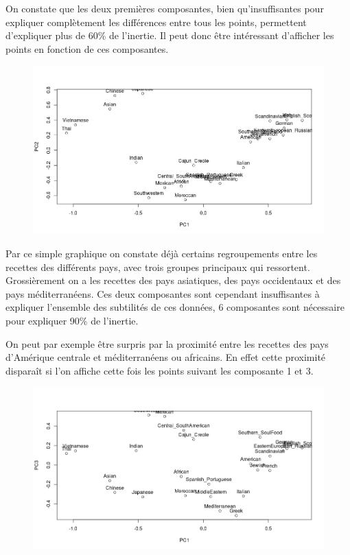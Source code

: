 \documentclass[a4paper, titlepage]{report}
\begin{document}
On constate que les deux premières composantes, bien qu'insuffisantes pour expliquer complètement les différences entre tous les points, permettent d'expliquer plus de 60\% de l'inertie. Il peut donc être intéressant d'afficher les points en fonction de ces composantes.
\begin{figure}[h]
	\begin{center}
		\includegraphics[scale = 0.32]{./doc/plot-recettes-composantes-1-2.png}
	\end{center}
\end{figure}

Par ce simple graphique on constate déjà certains regroupements entre les recettes des différents pays, avec trois groupes principaux qui ressortent. Grossièrement on a les recettes des pays asiatiques, des pays occidentaux et des pays méditerranéens. Ces deux composantes sont cependant insuffisantes à expliquer l'ensemble des subtilités de ces données, 6 composantes sont nécessaire pour expliquer 90\% de l'inertie.

On peut par exemple être surpris par la proximité entre les recettes des pays d’Amérique centrale et méditerranéens ou africains. En effet cette proximité disparaît si l'on affiche cette fois les points suivant les composante 1 et 3.
\begin{figure}[h]
	\begin{center}
		\includegraphics[scale = 0.32]{./doc/plot-recettes-composantes-1-3.png}
	\end{center}
\end{figure}
\end{document}
